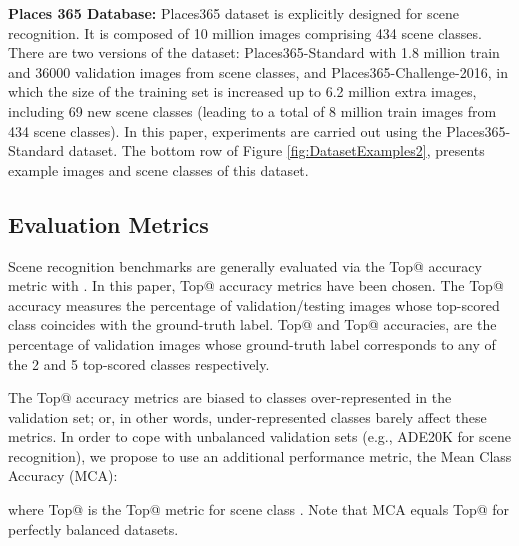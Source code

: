 \documentclass[review, 3p, sort&compress]{elsarticle}
\begin{document}
\textbf{Places 365 Database:} Places365 dataset \cite{zhou2018places} is explicitly designed for scene recognition. It is composed of 10 million images comprising 434 scene classes. There are two versions of the dataset: Places365-Standard with 1.8 million train and 36000 validation images from  scene classes, and Places365-Challenge-2016, in which the size of the training set is increased up to 6.2 million extra images, including 69 new scene classes (leading to a total of 8 million train images from 434 scene classes). In this paper, experiments are carried out using the Places365-Standard dataset. The bottom row of Figure \ref{fig:DatasetExamples2}, presents example images and scene classes of this dataset.

\subsection{Evaluation Metrics}
Scene recognition benchmarks are generally evaluated via the Top@ accuracy metric with . In this paper, Top@ accuracy metrics have been chosen. The Top@ accuracy measures the percentage of validation/testing images whose top-scored class coincides with the ground-truth label. Top@ and Top@ accuracies, are the percentage of validation images whose ground-truth label corresponds to any of the 2 and 5 top-scored classes respectively.

The Top@ accuracy metrics are biased to classes over-represented in the validation set; or, in other words, under-represented classes barely affect these metrics. In order to cope with unbalanced validation sets (e.g., ADE20K for scene recognition), we propose to use an additional performance metric, the Mean Class Accuracy (MCA):



where Top@ is the Top@ metric for scene class . Note that MCA equals Top@ for perfectly balanced datasets. 
\end{document}
